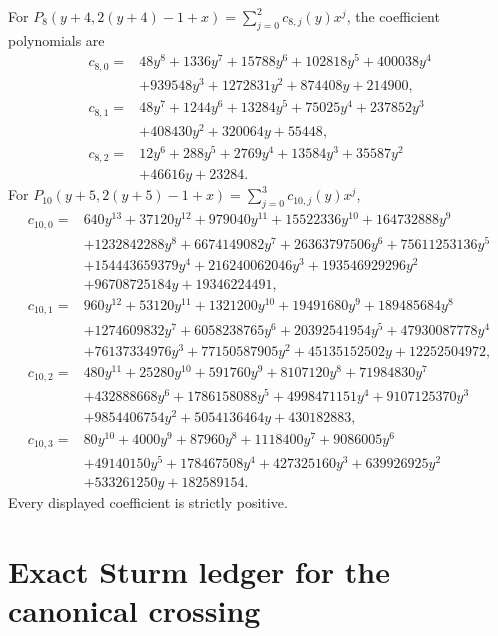 \documentclass[11pt]{article}
\begin{document}
For $P_8(y+4,2(y+4)-1+x)=\sum_{j=0}^2c_{8,j}(y)x^j$, the coefficient
polynomials are
\begin{align*}
c_{8,0}={}&48y^8+1336y^7+15788y^6+102818y^5+400038y^4\\
&+939548y^3+1272831y^2+874408y+214900,\\
c_{8,1}={}&48y^7+1244y^6+13284y^5+75025y^4+237852y^3\\
&+408430y^2+320064y+55448,\\
c_{8,2}={}&12y^6+288y^5+2769y^4+13584y^3+35587y^2\\
&+46616y+23284.
\end{align*}
For $P_{10}(y+5,2(y+5)-1+x)=\sum_{j=0}^3c_{10,j}(y)x^j$,
\begin{align*}
c_{10,0}={}&640y^{13}+37120y^{12}+979040y^{11}+15522336y^{10}
+164732888y^9\\
&+1232842288y^8+6674149082y^7+26363797506y^6
+75611253136y^5\\
&+154443659379y^4+216240062046y^3+193546929296y^2\\
&+96708725184y+19346224491,\\
c_{10,1}={}&960y^{12}+53120y^{11}+1321200y^{10}+19491680y^9
+189485684y^8\\
&+1274609832y^7+6058238765y^6+20392541954y^5
+47930087778y^4\\
&+76137334976y^3+77150587905y^2+45135152502y+12252504972,\\
c_{10,2}={}&480y^{11}+25280y^{10}+591760y^9+8107120y^8
+71984830y^7\\
&+432888668y^6+1786158088y^5+4998471151y^4
+9107125370y^3\\
&+9854406754y^2+5054136464y+430182883,\\
c_{10,3}={}&80y^{10}+4000y^9+87960y^8+1118400y^7+9086005y^6\\
&+49140150y^5+178467508y^4+427325160y^3+639926925y^2\\
&+533261250y+182589154.
\end{align*}
Every displayed coefficient is strictly positive.

\section{Exact Sturm ledger for the canonical crossing}
\end{document}
